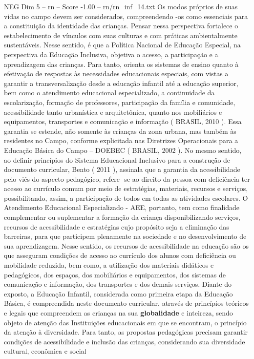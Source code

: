 \begin{textsample}{NEG Dim 5 – rn – Score -1.00 – rn/rn\_inf\_14.txt}
Os modos próprios de suas vidas no campo devem ser considerados, compreendendo -os como essenciais para a constituição da identidade das crianças.
Pensar nessa perspectiva fortalece o estabelecimento de vínculos com suas culturas e com práticas ambientalmente sustentáveis.
Nesse sentido, é que a Política Nacional de Educação Especial, na perspectiva da Educação Inclusiva, objetiva o acesso, a participação e a aprendizagem das crianças.
Para tanto, orienta os sistemas de ensino quanto à efetivação de respostas às necessidades educacionais especiais, com vistas a garantir a transversalização desde a educação infantil até a educação superior, bem como o atendimento educacional especializado, a continuidade da escolarização, formação de professores, participação da família e comunidade, acessibilidade tanto urbanística e arquitetônica, quanto nos mobiliários e equipamentos, transportes e comunicação e informação ( BRASIL, 2010 ).
Essa garantia se estende, não somente às crianças da zona urbana, mas também às residentes no Campo, conforme explicitada nas Diretrizes Operacionais para a Educação Básica do Campo – DOEBEC ( BRASIL, 2002 ).
No mesmo sentido, ao definir princípios do Sistema Educacional Inclusivo para a construção de documento curricular, Bento ( 2011 ), assinala que a garantia da acessibilidade pelo viés do aspecto pedagógico, refere -se ao direito da pessoa com deficiência ter acesso ao currículo comum por meio de estratégias, materiais, recursos e serviços, possibilitando, assim, a participação de todos em todas as atividades escolares.
O Atendimento Educacional Especializado - AEE, portanto, tem como finalidade complementar ou suplementar a formação da criança disponibilizando serviços, recursos de acessibilidade e estratégias cujo propósito seja a eliminação das barreiras, para que participem plenamente na sociedade e no desenvolvimento de sua aprendizagem.
Nesse sentido, os recursos de acessibilidade na educação são os que asseguram condições de acesso ao currículo dos alunos com deficiência ou mobilidade reduzida, bem como, a utilização dos materiais didáticos e pedagógicos, dos espaços, dos mobiliários e equipamentos, dos sistemas de comunicação e informação, dos transportes e dos demais serviços.
Diante do exposto, a Educação Infantil, considerada como primeira etapa da Educação Básica, é compreendida neste documento curricular, através de princípios teóricos e legais que compreendem as crianças na sua \textbf{globalidade} e inteireza, sendo objeto de atenção das Instituições educacionais em que se encontram, o princípio da atenção à diversidade.
Para tanto, as propostas pedagógicas precisam garantir condições de acessibilidade e inclusão das crianças, considerando sua diversidade cultural, econômica e social

\end{textsample}
